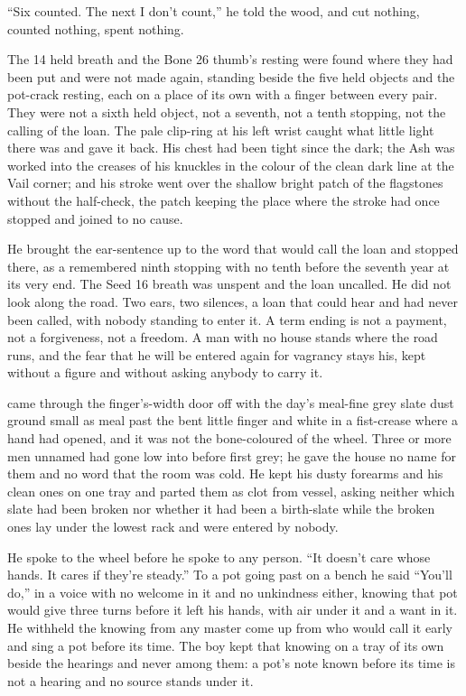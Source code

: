 “Six counted. The next I don't count,” he told the wood, and cut nothing, counted nothing, spent nothing.

The  14 held breath and the Bone 26 thumb's resting were found where they had been put and were not made again, standing beside the five held objects and the pot-crack resting, each on a place of its own with a finger between every pair. They were not a sixth held object, not a seventh, not a tenth stopping, not the calling of the loan. The pale clip-ring at his left wrist caught what little light there was and gave it back. His chest had been tight since the dark; the Ash was worked into the creases of his knuckles in the colour of the clean dark line at the Vail corner; and his stroke went over the shallow bright patch of the flagstones without the half-check, the patch keeping the place where the stroke had once stopped and joined to no cause.

He brought the ear-sentence up to the word that would call the loan and stopped there, as a remembered ninth stopping with no tenth before the seventh year at its very end. The Seed 16 breath was unspent and the loan uncalled. He did not look along the road. Two ears, two silences, a loan that could hear and had never been called, with nobody standing to enter it. A term ending is not a payment, not a forgiveness, not a freedom. A man with no house stands where the road runs, and the fear that he will be entered again for vagrancy stays his, kept without a figure and without asking anybody to carry it.

 came through the finger's-width door off  with the day's meal-fine grey slate dust ground small as meal past the bent little finger and white in a fist-crease where a hand had opened, and it was not the bone-coloured  of the wheel. Three or more men unnamed had gone low into  before first grey; he gave the house no name for them and no word that the room was cold. He kept his dusty forearms and his clean ones on one tray and parted them as clot from vessel, asking neither which slate had been broken nor whether it had been a birth-slate while the broken ones lay under the lowest rack and were entered by nobody.

He spoke to the wheel before he spoke to any person. “It doesn't care whose hands. It cares if they're steady.” To a pot going past on a bench he said “You'll do,” in a voice with no welcome in it and no unkindness either, knowing  that pot would give three turns before it left his hands, with air under it and a want in it. He withheld the knowing from any master come up from  who would call it early and sing a pot before its time. The boy kept that knowing on a tray of its own beside the hearings and never among them: a pot's note known before its time is not a hearing and no source stands under it.

